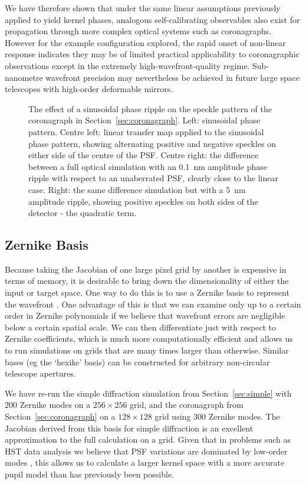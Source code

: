 \documentclass[modern]{aastex63}
\begin{document}
We have therefore shown that under the same linear assumptions previously applied to yield kernel phases, analogous self-calibrating observables also exist for propagation through more complex optical systems such as coronagraphs. However for the example configuration explored, the rapid onset of non-linear response indicates they may be of limited practical applicability to coronagraphic observations except in the extremely high-wavefront-quality regime. Sub-nanometre wavefront precision may nevertheless be achieved in future large space telescopes with high-order deformable mirrors.

\begin{figure}
\caption{The effect of a sinusoidal phase ripple on the speckle pattern of the coronagraph in Section~\ref{sec:coronagraph}. Left: sinusoidal phase pattern. Centre left: linear transfer map applied to the sinusoidal phase pattern, showing alternating positive and negative speckles on either side of the centre of the PSF. Centre right: the difference between a full optical simulation with an 0.1~nm amplitude phase ripple with respect to an unaberrated PSF, clearly close to the linear case. Right: the same difference simulation but with a 5~nm amplitude ripple, showing positive speckles on both sides of the detector - the quadratic term. \label{corona_nonlinearity}}
\end{figure}

\subsection{Zernike Basis}
\label{zernike}

Because taking the Jacobian of one large pixel grid by another is expensive in terms of memory, it is desirable to bring down the dimensionality of either the input or target space. One way to do this is to use a Zernike basis to represent the wavefront \citep{zernike34}. One advantage of this is that we can examine only up to a certain order in Zernike polynomials if we believe that wavefront errors are negligible below a certain spatial scale. We can then differentiate just with respect to Zernike coefficients, which is much more computationally efficient and allows us to run simulations on grids that are many times larger than otherwise. Similar bases (eg the `hexike' basis) can be constructed for arbitrary non-circular telescope apertures.

We have re-run the simple diffraction simulation from Section~\ref{sec:simple} with 200 Zernike modes on a $256\times256$ grid, and the coronagraph from Section~\ref{sec:coronagraph} on a $128\times128$ grid using 300 Zernike modes. 
The Jacobian derived from this basis for simple diffraction is an excellent approximation to the full calculation on a grid. Given that in problems such as HST data analysis we believe that PSF variations are dominated by low-order modes \citep{pope13}, this allows us to calculate a larger kernel space with a more accurate pupil model than has previously been possible. 
\end{document}
